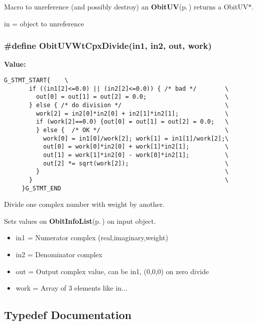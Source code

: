 Macro to unreference (and possibly destroy) an {\bf Obit\-UV}{\rm (p.\,\pageref{structObitUV})} returns a Obit\-UV$\ast$. 

in = object to unreference 
\subsubsection{\setlength{\rightskip}{0pt plus 5cm}\#define Obit\-UVWt\-Cpx\-Divide(in1, in2, out, work)}\label{ObitUV_8h_a6}


{\bf Value:}

\footnotesize\begin{verbatim}G_STMT_START{    \
       if ((in1[2]<=0.0) || (in2[2]<=0.0)) { /* bad */        \
         out[0] = out[1] = out[2] = 0.0;                      \
       } else { /* do division */                             \
         work[2] = in2[0]*in2[0] + in2[1]*in2[1];             \
         if (work[2]==0.0) {out[0] = out[1] = out[2] = 0.0;   \
         } else {  /* OK */                                   \
           work[0] = in1[0]/work[2]; work[1] = in1[1]/work[2];\
           out[0] = work[0]*in2[0] + work[1]*in2[1];          \
           out[1] = work[1]*in2[0] - work[0]*in2[1];          \
           out[2] *= sqrt(work[2]);                           \
         }                                                    \
       }                                                      \
     }G_STMT_END
\end{verbatim}\normalsize 
Divide one complex number with weight by another. 

Sets values on {\bf Obit\-Info\-List}{\rm (p.\,\pageref{structObitInfoList})} on input object. \begin{itemize}
\item in1 = Numerator complex (real,imaginary,weight) \item in2 = Denominator complex \item out = Output complex value, can be in1, (0,0,0) on zero divide \item work = Array of 3 elements like in... \end{itemize}


\subsection{Typedef Documentation}
